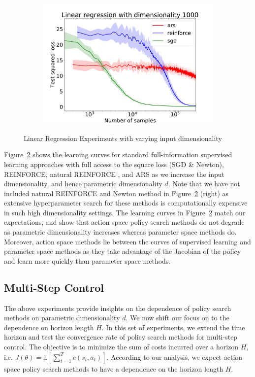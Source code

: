 \begin{figure}[t]
\begin{subfigure}{0.32\linewidth}
\end{subfigure}
\begin{subfigure}{0.32\linewidth}
  \includegraphics[width=\linewidth]{figures/aistats19/lin_1000_log.pdf}\label{fig:lin1000}
\end{subfigure}
  \caption{Linear Regression Experiments with varying input
    dimensionality}
  \label{fig:linear}
\end{figure}
Figure~\ref{fig:linear} shows the learning curves for standard full-information
supervised learning approaches with full access to the square loss (SGD \& Newton), REINFORCE, natural REINFORCE
\citep{kakade2002natural}, and ARS as we increase the 
input dimensionality, and hence parametric dimensionality $d$. 
%
%
%
Note that we have not included natural REINFORCE and Newton method in
Figure~\ref{fig:linear} (right) as extensive hyperparameter search for these methods is computationally expensive in such high dimensionality settings.
The learning curves in Figure~\ref{fig:linear}
match our expectations, and show that action space policy
search methods do not degrade as parametric dimensionality increases
whereas parameter space methods do. Moreover, action space methods lie
between the curves of supervised learning and parameter space
methods as they take advantage of the Jacobian of the policy and
learn  more quickly than parameter space methods.


\subsection{Multi-Step Control}
\label{sec:multi-step-control}

The above experiments provide insights on the dependence of
policy search methods on parametric
dimensionality $d$. We now shift our focus on to the dependence on horizon
length $H$.
In this set of experiments, we extend the time horizon and test the convergence rate of
policy search methods for multi-step control. The objective is to
minimize the sum of costs incurred over a horizon $H$, i.e. $J(\theta)
= \mathbb{E}[\sum_{t=1}^T c(s_t, a_t)]$. According to our analysis, we
expect action space policy search methods to have a dependence
on the horizon length $H$.

